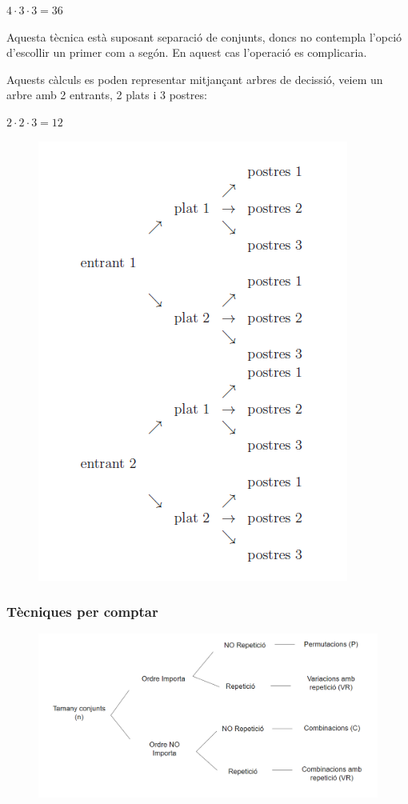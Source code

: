 \documentclass{article}
\begin{document}
$4 \cdot 3 \cdot 3 = 36$

Aquesta tècnica està suposant separació de conjunts, doncs no contempla l'opció d'escollir un primer com a segón. En aquest cas l'operació es complicaria.

Aquests càlculs es poden representar mitjançant arbres de decissió, veiem un arbre amb 2 entrants, 2 plats i 3 postres:

$2 \cdot 2 \cdot 3 = 12$

\begin{figure}[H]
    \includegraphics[scale=0.8]{pictures/image2.png}
\end{figure}


\subsubsection{Tècniques per comptar}

\begin{figure}[H]
    \includegraphics[scale=0.4]{pictures/image1.png}
    \centering
\end{figure}
\end{document}

